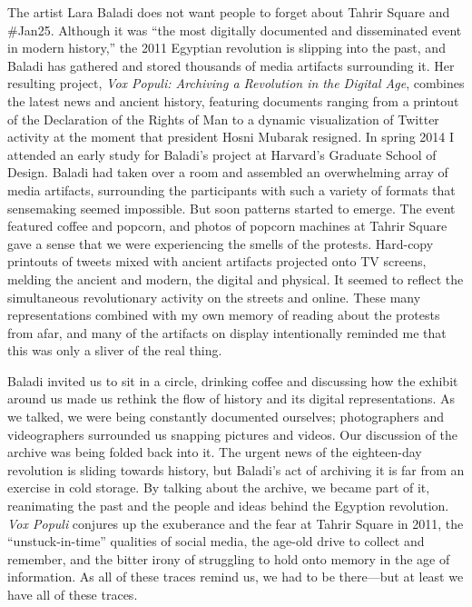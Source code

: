 The artist Lara Baladi does not want people to forget about Tahrir Square and \#Jan25. Although it was ``the most digitally documented and disseminated event in modern history,'' the 2011 Egyptian revolution is slipping into the past, and Baladi has gathered and stored thousands of media artifacts surrounding it.\autocite{baladi_vox_????} Her resulting project, \emph{Vox Populi: Archiving a Revolution in the Digital Age}, combines the latest news and ancient history, featuring documents ranging from a printout of the Declaration of the Rights of Man to a dynamic visualization of Twitter activity at the moment that president Hosni Mubarak resigned. In spring 2014 I attended an early study for Baladi's project at Harvard's Graduate School of Design. Baladi had taken over a room and assembled an overwhelming array of media artifacts, surrounding the participants with such a variety of formats that sensemaking seemed impossible. But soon patterns started to emerge. The event featured coffee and popcorn, and photos of popcorn machines at Tahrir Square gave a sense that we were experiencing the smells of the protests. Hard-copy printouts of tweets mixed with ancient artifacts projected onto TV screens, melding the ancient and modern, the digital and physical. It seemed to reflect the simultaneous revolutionary activity on the streets and online. These many representations combined with my own memory of reading about the protests from afar, and many of the artifacts on display intentionally reminded me that this was only a sliver of the real thing.

Baladi invited us to sit in a circle, drinking coffee and discussing how the exhibit around us made us rethink the flow of history and its digital representations. As we talked, we were being constantly documented ourselves; photographers and videographers surrounded us snapping pictures and videos. Our discussion of the archive was being folded back into it. The urgent news of the eighteen-day revolution is sliding towards history, but Baladi's act of archiving it is far from an exercise in cold storage. By talking about the archive, we became part of it, reanimating the past and the people and ideas behind the Egyption revolution. \emph{Vox Populi} conjures up the exuberance and the fear at Tahrir Square in 2011, the ``unstuck-in-time'' qualities of social media, the age-old drive to collect and remember, and the bitter irony of struggling to hold onto memory in the age of information. As all of these traces remind us, we had to be there---but at least we have all of these traces.



